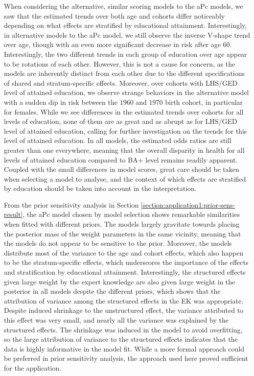 \vspace{-0.2cm}
When considering the alternative, similar scoring models to the aPc models, we saw that the estimated trends over both age and cohorts differ noticeably depending on what effects are stratified by educational attainment. Interestingly, in alternative models to the aPc model, we still observe the inverse V-shape trend over age, though with an even more significant decrease in risk after age $60$. Interestingly, the two different trends in each group of education over age appear to be rotations of each other. However, this is not a cause for concern, as the models are inherently distinct from each other due to the different specifications of shared and stratum-specific effects. Moreover, over cohorts with LHS/GED level of attained education, we observe strange behaviors in the alternative model with a sudden dip in risk between the $1960$ and $1970$ birth cohort, in particular for females. While we see differences in the estimated trends over cohorts for all levels of education, none of them are as great and as abrupt as for LHS/GED level of attained education, calling for further investigation on the trends for this level of attained education. In all models, the estimated odds ratios are still greater than one everywhere, meaning that the overall disparity in health for all levels of attained education compared to BA+ level remains readily apparent. Coupled with the small differences in model scores, great care should be taken when selecting a model to analyse, and the context of which effects are stratified by education should be taken into account in the interpretation. 

\vspace{-0.2cm}
From the prior sensitivity analysis in Section \ref{section:application1:prior-sens-result}, the aPc model chosen by model selection shows remarkable similarities when fitted with different priors. The models largely gravitate towards placing the posterior mass of the weight parameters in the same vicinity, meaning that the models do not appear to be sensitive to the prior. Moreover, the models distribute most of the variance to the age and cohort effects, which also happen to be the stratum-specific effects, which underscores the importance of the effects and stratification by educational attainment. Interestingly, the structured effects given large weight by the expert knowledge are also given large weight in the posterior in all models despite the different priors, which shows that the attribution of variance among the structured effects in the EK was appropriate. Despite induced shrinkage to the unstructured effect, the variance attributed to this effect was very small, and nearly all the variance was explained by the structured effects. The shrinkage was induced in the model to avoid overfitting, so the large attribution of variance to the structured effects indicates that the data is highly informative in the model fit. While a more formal approach could be preferred in prior sensitivity analysis, the approach used here proved sufficient for the application.

